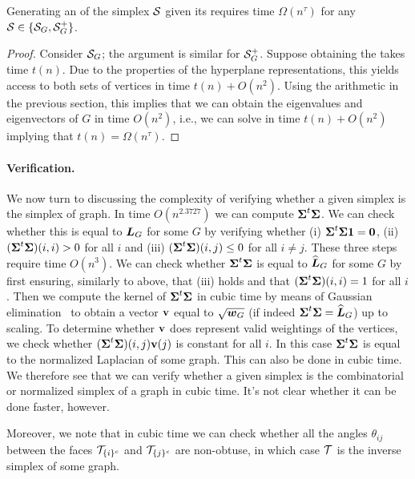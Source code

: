 \begin{lemma}
	\label{lem:hdesc_to_vdesc}
	Generating an \vdesc of the simplex $\mathcal{S}$ given its \hdesc requires time $\Omega(n^\tau)$ for any $\mathcal{S}\in\{\mathcal{S}_G,\mathcal{S}_G^+\}$. 
\end{lemma}
\begin{proof}
	Consider $\mathcal{S}_G$; the argument is similar for $\mathcal{S}_G^+$. Suppose obtaining the \hdesc takes time $t(n)$. Due to the properties of the hyperplane representations, this yields access to both sets of vertices in time $t(n)+O(n^2)$. Using the arithmetic in the previous section, this implies that we can obtain the eigenvalues and eigenvectors of $G$ in time $O(n^2)$, i.e., we can solve \lapdecomp in time $t(n)+O(n^2)$ implying that $t(n)=\Omega(n^\tau)$. 
\end{proof}


\paragraph{Verification.}
We  now turn  to discussing the complexity of  verifying whether  a given simplex is the simplex of graph. 
In time $O(n^{2.3727})$ we can compute $\boldsymbol{\Sigma}^t\boldsymbol{\Sigma}$. We can check whether this is equal to $\vb*{L}_G$ for some $G$ by verifying whether (i) $\boldsymbol{\Sigma}^t\boldsymbol{\Sigma}\vb{1}=\vb{0}$, (ii) $(\boldsymbol{\Sigma}^t\boldsymbol{\Sigma})(i,i)>0$ for all $i$ and (iii) $(\boldsymbol{\Sigma}^t\boldsymbol{\Sigma})(i,j)\leq 0$ for all $i\neq j$. These three steps require time $O(n^3)$. We can check whether $\boldsymbol{\Sigma}^t\boldsymbol{\Sigma}$ is equal to $\widehat{\vb*{L}}_G$ for some $G$ by first ensuring, similarly to above, that (iii) holds and that $(\boldsymbol{\Sigma}^t\boldsymbol{\Sigma})(i,i)=1$ for all $i$. Then we compute the kernel  of $\boldsymbol{\Sigma}^t\boldsymbol{\Sigma}$ in cubic time by means of Gaussian elimination~\cite{kailath1999fast} to obtain a vector $\vb{v}$ equal to $\sqrt{\vb*{w}_G}$ (if indeed $\boldsymbol{\Sigma}^t\boldsymbol{\Sigma}=\widehat{\vb*{L}}_G$) up to scaling. To determine whether $\vb{v}$ does represent valid weightings of the vertices, we check whether $(\boldsymbol{\Sigma}^t\boldsymbol{\Sigma})(i,j)\vb{v}(j)$ is constant for all $i$. In  this case $\boldsymbol{\Sigma}^t\boldsymbol{\Sigma}$ is equal to the normalized Laplacian of some graph. This can also be done in cubic time. We  therefore see that we can  verify whether a given simplex is the combinatorial or  normalized simplex of a graph in  cubic time. It's not clear whether it can be done faster, however. 

Moreover, we note that in cubic time we can check whether all the angles $\theta_{ij}$ between the faces $\mathcal{T}_{\{i\}^c}$ and $\mathcal{T}_{\{j\}^c}$ are non-obtuse, in which case $\mathcal{T}$ is the inverse simplex of some graph. 


